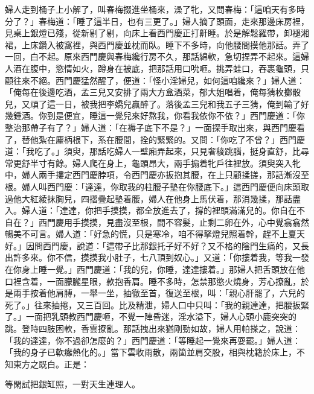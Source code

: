 婦人走到桶子上小解了，叫春梅掇進坐桶來，澡了牝，又問春梅：「這咱天有多時分了？」春梅道：「睡了這半日，也有三更了。」婦人摘了頭面，走來那邊床房裡，見桌上銀燈已殘，從新剔了剔，向床上看西門慶正打鼾睡。於是解鬆羅帶，卸褪湘裙，上床鑽入被窩裡，與西門慶並枕而臥。睡下不多時，向他腰間摸他那話。弄了一回，白不起。原來西門慶與春梅纔行房不久，那話綿軟，急切捏弄不起來。這婦人酒在腹中，慾情如火，蹲身在被底，把那話用口吮咂。挑弄蛙口，吞裹龜頭，只顧往來不絕。西門慶猛然醒了，便道：「怪小淫婦兒，如何這咱纔來？」婦人道：「俺每在後邊吃酒，孟三兒又安排了兩大方盒酒菜，郁大姐唱着，俺每猜枚擲骰兒，又頑了這一日，被我把李嬌兒贏醉了。落後孟三兒和我五子三猜，俺到輸了好幾鍾酒。你到是便宜，睡這一覺兒來好熬我，你看我依你不依？」{}西門慶道：「你整治那帶子有了？」婦人道：「在褥子底下不是？」一面探手取出來，與西門慶看了，替他紮在麈柄根下，系在腰間，拴的緊緊的。又問：「你吃了不曾？」西門慶道：「我吃了。」須臾，那話吃婦人一壁廂弄起來，{}只見奢稜跳腦，挺身直舒，比尋常更舒半寸有餘。婦人爬在身上，龜頭昂大，兩手搧着牝戶往裡放。須臾突入牝中，婦人兩手摟定西門慶脖項，令西門慶亦扳抱其腰，在上只顧揉搓，那話漸沒至根。婦人叫西門慶：「達達，你取我的柱腰子墊在你腰底下。」這西門慶便向床頭取過他大紅綾抹胸兒，四摺疊起墊着腰，婦人在他身上馬伏着，那消幾揉，那話盡入。婦人道：「達達，你把手摸摸，都全放進去了，撐的裡頭滿滿兒的。你自在不自在？」西門慶用手摸摸，見盡沒至根，間不容髮，止剩二卵在外，心中覺翕翕然暢美不可言。婦人道：「好急的慌，只是寒冷，咱不得拏燈兒照着幹，趕不上夏天好。」因問西門慶，說道：「這帶子比那銀托子好不好？又不格的陰門生痛的，又長出許多來。你不信，摸摸我小肚子，七八頂到奴心。」又道：「你摟着我，等我一發在你身上睡一覺。」西門慶道：「我的兒，你睡，達達摟着。」那婦人把舌頭放在他口裡含着，一面朦朧星眼，款抱香肩。睡不多時，怎禁那慾火燒身，芳心撩亂，於是兩手按着他肩膊，一舉一坐，抽徹至首，復送至根，叫：「親心肝罷了，六兒的死了。」往來抽捲，又三百回。比及精泄，婦人口中只叫：「我的親達達，把腰扳緊了。」一面把乳頭教西門慶咂，不覺一陣昏迷，淫水溢下，婦人心頭小鹿突突的跳。登時四肢困軟，香雲撩亂。那話拽出來猶剛勁如故，婦人用帕搽之，說道：「我的達達，你不過卻怎麼的？」西門慶道：「等睡起一覺來再耍罷。」婦人道：「我的身子已軟癱熱化的。」{}當下雲收雨散，兩箇並肩交股，相與枕籍於床上，不知東方之既白。正是：

\begin{myquote}
等閑試把銀缸照，一對天生連理人。
\end{myquote}

